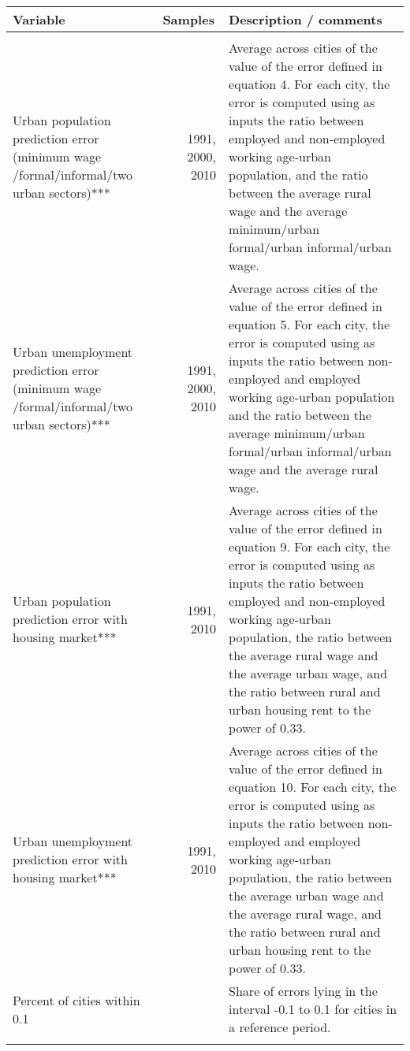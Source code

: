 \renewcommand{\arraystretch}{1.3}
    \begin{tabular}{p{14.445em}rp{37.89em}}
    \multicolumn{1}{l}{\textbf{Variable}} & \multicolumn{1}{l}{\textbf{Samples}} & \multicolumn{1}{l}{\textbf{Description / comments}} \\
    \midrule
    \multicolumn{1}{r}{} &       & \multicolumn{1}{r}{} \\
   Urban population prediction error (minimum wage /formal/informal/two urban sectors)*** & \multicolumn{1}{p{7.055em}}{1991, 2000, 2010} & Average across cities of the value of the error defined in equation 4. For each city, the error is computed using as inputs the ratio between employed and non-employed working age-urban population, and the ratio between the average rural wage and the average minimum/urban formal/urban informal/urban wage.  \\ 
    Urban unemployment prediction error (minimum wage /formal/informal/two urban sectors)*** & \multicolumn{1}{p{7.055em}}{1991, 2000, 2010} &   Average across cities of the value of the error defined in equation 5. For each city, the error is computed using as inputs the ratio between non-employed and employed working age-urban population and the ratio between the average minimum/urban formal/urban informal/urban wage and the average rural wage.  \\
    Urban population prediction error with housing market*** & \multicolumn{1}{p{7.055em}}{1991,  2010} &   Average across cities of the value of the error defined in equation 9. For each city, the error is computed using as inputs the ratio between employed and non-employed working age-urban population, the ratio between the average rural wage and the average urban wage, and the ratio between rural and urban housing rent to the power of 0.33.  \\
    Urban unemployment prediction error with housing market*** & \multicolumn{1}{p{7.055em}}{1991, 2010} &   Average across cities of the value of the error defined in equation 10. For each city, the error is computed using as inputs the ratio between non-employed and employed working age-urban population, the ratio between the average urban wage and the average rural wage, and the ratio between rural and urban housing rent to the power of 0.33.    \\
    Percent of cities within 0.1 &       & Share of errors lying in the interval -0.1  to  0.1  for cities in a reference period. \\
    \multicolumn{1}{r}{} &       & \multicolumn{1}{r}{} \\


    \bottomrule

    \end{tabular}%

